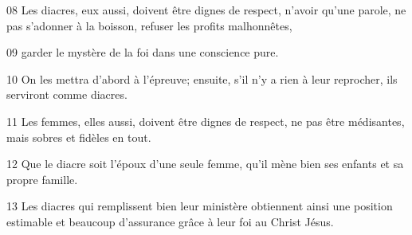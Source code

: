
08 Les diacres, eux aussi, doivent être dignes de respect, n’avoir qu’une parole, ne pas s’adonner à la boisson, refuser les profits malhonnêtes,

09 garder le mystère de la foi dans une conscience pure.

10 On les mettra d’abord à l’épreuve; ensuite, s’il n’y a rien à leur reprocher, ils serviront comme diacres.

11 Les femmes, elles aussi, doivent être dignes de respect, ne pas être médisantes, mais sobres et fidèles en tout.

12 Que le diacre soit l’époux d’une seule femme, qu’il mène bien ses enfants et sa propre famille.

13 Les diacres qui remplissent bien leur ministère obtiennent ainsi une position estimable et beaucoup d’assurance grâce à leur foi au Christ Jésus.
